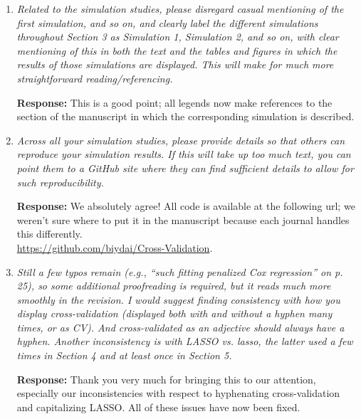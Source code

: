 \documentclass{article}
\newcommand{\re}{\textbf{Response: }}
\begin{document}
\begin{enumerate}[align = left]
  \re Our goal is to assess the true prediction accuracy of the model (using the entire population). For this, the larger the number we use, the better (lower Monte Carlo error). We could use 100,000 or 10,000,000 observations, but it doesn't make much difference -- 1,000 observations is adequate. What you are describing is the question of how an analyst might use the data to both fit a model and obtain an estimate of that model's predictive accuracy. This is important, but not the subject of our manuscript. Our paper is about \emph{model selection} (estimating the performance of different models in order to choose the best one), not \emph{model assessment} (having chosen a final model, estimating its prediction error).
  
\item \emph{Related to the simulation studies, please disregard casual mentioning of the first simulation, and so on, and clearly label the different simulations throughout Section 3 as Simulation 1, Simulation 2, and so on, with clear mentioning of this in both the text and the tables and figures in which the results of those simulations are displayed. This will make for much more straightforward reading/referencing.}

  \re This is a good point; all legends now make references to the section of the manuscript in which the corresponding simulation is described.

\item \emph{Across all your simulation studies, please provide details so that others can reproduce your simulation results. If this will take up too much text, you can point them to a GitHub site where they can find sufficient details to allow for such reproducibility.}

  \re We absolutely agree! All code is available at the following url; we weren't sure where to put it in the manuscript because each journal handles this differently. \\
  \url{https://github.com/biydai/Cross-Validation}.

\item \emph{Still a few typos remain (e.g., “such fitting penalized Cox regression” on p. 25), so some additional proofreading is required, but it reads much more smoothly in the revision.  I would suggest finding consistency with how you display cross-validation (displayed both with and without a hyphen many times, or as CV).  And cross-validated as an adjective should always have a hyphen.  Another inconsistency is with LASSO vs. lasso, the latter used a few times in Section 4 and at least once in Section 5.}

  \re Thank you very much for bringing this to our attention, especially our inconsistencies with respect to hyphenating cross-validation and capitalizing LASSO. All of these issues have now been fixed.

\end{enumerate}
\end{document}

